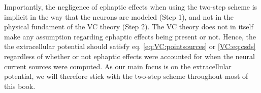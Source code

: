 Importantly, the negligence of ephaptic effects when using the two-step scheme is implicit in the way that the neurons are modeled (Step 1), and not in the physical fundament of the VC theory (Step 2). The VC theory does not in itself make any assumption regarding ephaptic effects being present or not. Hence, the the extracellular potential should satisfy eq. \ref{eq:VC:pointsources} or \ref{VC:eq:csds} regardless of whether or not ephaptic effects were accounted for when the neural current sources were computed. As our main focus is on the extracellular potential, we will therefore stick with the two-step scheme throughout most of this book.